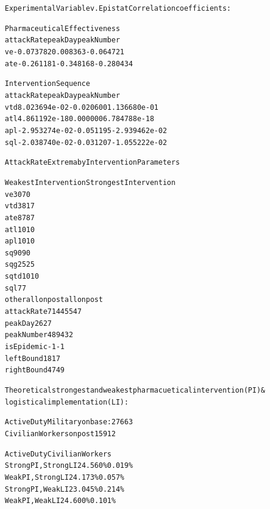 \documentclass[letterpaper,10pt,english]{/Library/Python/2.7/site-packages/sphinx/texinputs/sphinxhowto}
\newenvironment{InvisibleVerbatim}
        {\begin{mdframed}[leftmargin=0.1\linewidth,innerleftmargin=3pt,innerrightmargin=3pt, userdefinedwidth=1\linewidth, linewidth=0pt, linecolor=white, usetwoside=false]}
        {\end{mdframed}}
\begin{document}
                \begin{InvisibleVerbatim}
                \vspace{-0.5\baselineskip}
\begin{alltt}Experimental Variable v. Epistat Correlation coefficients:

Pharmaceutical Effectiveness
     attackRate   peakDay  peakNumber
ve    -0.073782  0.008363   -0.064721
ate   -0.261181 -0.348168   -0.280434

Intervention Sequence
       attackRate   peakDay    peakNumber
vtd  8.023694e-02 -0.020600  1.136680e-01
atl  4.861192e-18  0.000000  6.784788e-18
apl -2.953274e-02 -0.051195 -2.939462e-02
sql -2.038740e-02 -0.031207 -1.055222e-02


Attack Rate Extrema by Intervention Parameters

           Weakest Intervention Strongest Intervention
ve                           30                     70
vtd                          38                     17
ate                          87                     87
atl                          10                     10
apl                          10                     10
sq                           90                     90
sqg                          25                     25
sqtd                         10                     10
sql                           7                      7
other                 allonpost              allonpost
attackRate                 7144                   5547
peakDay                      26                     27
peakNumber                  489                    432
isEpidemic                   -1                     -1
leftBound                    18                     17
rightBound                   47                     49


Theoretical strongest and weakest pharmacuetical intervention (PI) \&
logistical implementation (LI):

Active Duty Military on base: 27663
Civilian Workers on post 15912

                Active Duty     Civilian Workers
Strong PI, Strong LI    24.560\%         0.019\%
Weak PI, Strong LI      24.173\%         0.057\%
Strong PI, Weak LI      23.045\%         0.214\%
Weak PI, Weak LI        24.600\%         0.101\%



\end{alltt}

            \end{InvisibleVerbatim}
            
\end{document}
